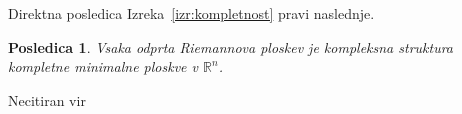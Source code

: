 \documentclass[12pt,a4paper,twoside]{article}
\newcommand{\literatura}{literatura}  %
\theoremstyle{definition} %
\theoremstyle{plain} %
\newtheorem{posledica}[definicija]{Posledica}
\numberwithin{equation}{section}  %
\newcommand{\R}{\mathbb R}
\begin{document}
Direktna posledica Izreka~\ref{izr:kompletnost} pravi naslednje.

\begin{posledica}
Vsaka odprta Riemannova ploskev je kompleksna struktura kompletne minimalne ploskve v $\R^{n}$.
\end{posledica}

Necitiran vir~\cite{forstneric2021minimal}


\cleardoublepage                           %

\cleardoublepage                           %
\printindex
\end{document}
